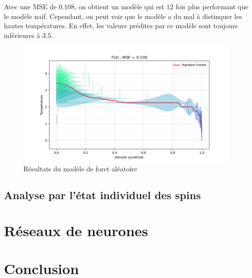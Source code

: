 \documentclass[11pt, parskip=half]{scrartcl} %
\begin{document}
Avec une MSE de $0.108$, on obtient un modèle qui est $12$ fois plus performant que le modèle naif. Cependant, on peut voir que le modèle a du mal à distinquer les hautes températures. En effet, les valeurs prédites par ce modèle sont toujours inférieures à $3.5$.

\begin{figure}[h]
	\centering
	\includegraphics[width=0.75\linewidth]{./figures/forest.png}
	\caption{Résultats du modèle de foret aléatoire}
	\label{fig:forest}
\end{figure}

\subsection{Analyse par l'état individuel des spins}

\section{Réseaux de neurones}

\section*{Conclusion}
\end{document}
